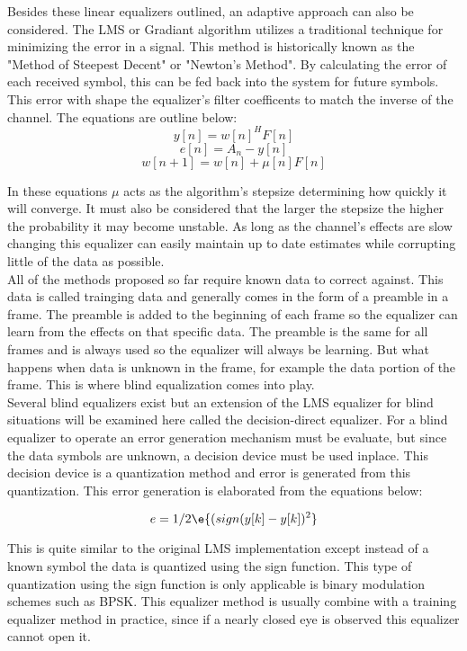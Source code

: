 Besides these linear equalizers outlined, an adaptive approach can also be considered.  The LMS or Gradiant algorithm utilizes a traditional technique for minimizing the error in a signal.  This method is historically known as the "Method of Steepest Decent" or "Newton's Method". By calculating the error of each received symbol, this can be fed back into the system for future symbols.  This error with shape the equalizer's filter coefficents to match the inverse of the channel.  The equations are outline below:\\

\[ y[n]=w[n]^{H}F[n]\]
\[ e[n]=A_{n}-y[n]\]
\[ w[n+1]=w[n]+\mu[n]F[n]\] 

In these equations \(\mu\) acts as the algorithm's stepsize determining how quickly it will converge.  It must also be considered that the larger the stepsize the higher the probability it may become unstable.  As long as the channel's effects are slow changing this equalizer can easily maintain up to date estimates while corrupting little of the data as possible.\\  

All of the methods proposed so far require known data to correct against.  This data is called trainging data and generally comes in the form of a preamble in a frame.  The preamble is added to the beginning of each frame so the equalizer can learn from the effects on that specific data.  The preamble is the same for all frames and is always used so the equalizer will always be learning.  But what happens when data is unknown in the frame, for example the data portion of the frame.  This is where blind equalization comes into play.\\

Several blind equalizers exist but an extension of the LMS equalizer for blind situations will be examined here called the decision-direct equalizer.  For a blind equalizer to operate an error generation mechanism must be evaluate, but since the data symbols are unknown, a decision device must be used inplace.  This decision device is a quantization method and error is generated from this quantization.  This error generation is elaborated from the equations below:

\[ e = 1/2\e{(sign(y[k]-y[k])^{2}}\]

This is quite similar to the original LMS implementation except instead of a known symbol the data is quantized using the sign function.  This type of quantization using the sign function is only applicable is binary modulation schemes such as BPSK.  This equalizer method is usually combine with a training equalizer method in practice, since if a nearly closed eye is observed this equalizer cannot open it.\\

